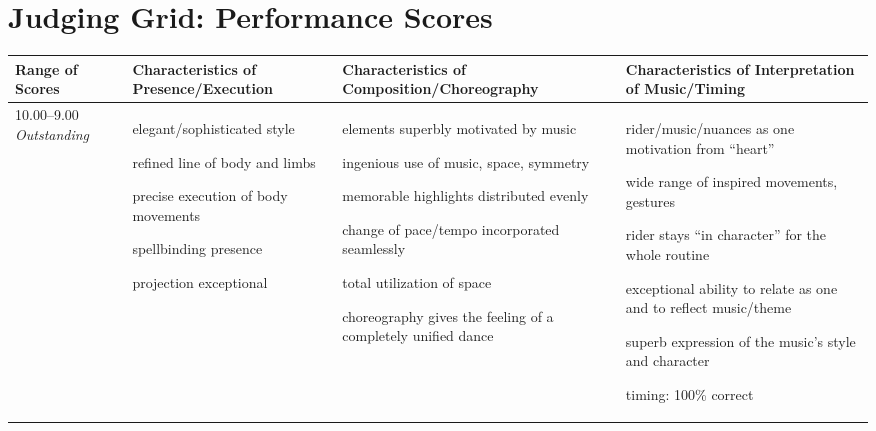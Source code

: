 \section{Judging Grid: Performance Scores}
\begingroup
    \fontsize{7pt}{9pt}\selectfont
\setlength{\LTleft}{-2.5cm} 
\begin{longtable}{|p{1.5cm}|p{5.5cm}|p{5.5cm}|p{5.5cm}|}
\hline
\textbf{Range of Scores} &
\textbf{Characteristics of \newline Presence/Execution} &
\textbf{Characteristics of \newline Composition/Choreography} &
\textbf{Characteristics of \newline Interpretation of Music/Timing} \\
\hline
10.00--9.00 \newline
\emph{Outstanding} &

\begin{judging_items}%
\item elegant/sophisticated style
\item refined line of body and limbs
\item precise execution of body movements
\item spellbinding presence
\item projection exceptional
\end{judging_items} &

\begin{judging_items}%
\item elements superbly motivated by music
\item ingenious use of music, space, symmetry
\item memorable highlights distributed evenly
\item change of pace/tempo incorporated seamlessly
\item total utilization of space
\item choreography gives the feeling of a completely unified dance 
\end{judging_items} &

\begin{judging_items}%
\item rider/music/nuances as one motivation from ``heart''
\item wide range of inspired movements, gestures
\item rider stays ``in character'' for the whole routine
\item exceptional ability to relate as one and to reflect music/theme
\item superb expression of the music's style and character
\item timing: 100\% correct
\end{judging_items} \\
\hline


\end{longtable}
